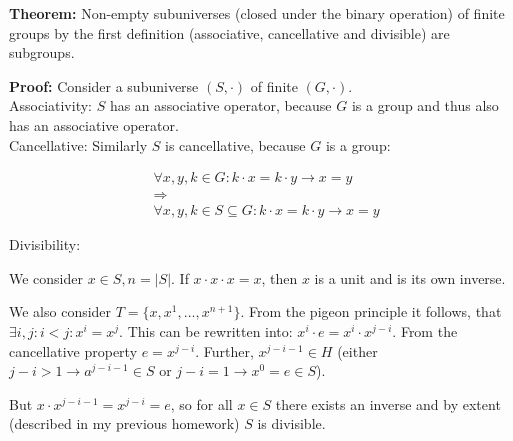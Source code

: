 \documentclass[a4paper]{article}
\begin{document}
\thispagestyle{fancy} %
{}

\textbf{Theorem: } Non-empty subuniverses (closed under the binary operation) of finite groups by the first definition (associative, cancellative and divisible) are subgroups.

\textbf{Proof: }
Consider a subuniverse $(S,\cdot)$ of finite $(G, \cdot)$.\\

Associativity: $S$ has an associative operator, because $G$ is a group and thus also has an associative operator. \\

Cancellative: Similarly $S$ is cancellative, because $G$ is a group:

\begin{align*}
	&\forall x, y, k \in G: k\cdot x = k\cdot y \rightarrow x = y \\
	&\Rightarrow \\
	&\forall x, y, k \in S \subseteq G: k\cdot x = k\cdot y \rightarrow x = y
\end{align*}

Divisibility:

We consider $x \in S, n = |S|$. If $x\cdot x \cdot x = x$, then $x$ is a unit and is its own inverse.

We also consider $T = \{x, x^1, \ldots, x^{n+1}\}$. From the pigeon principle it follows, that $\exists i, j: i < j: x^i = x^j$. This can be rewritten into: $x^i \cdot e = x^i \cdot x^{j-i}$. From the cancellative property $e = x^{j-i}$. Further, $x^{j-i-1} \in H$ (either $j-i>1 \rightarrow a^{j-i-1} \in S$ or $j-i=1 \rightarrow x^0 = e \in S$).

But $x\cdot x^{j-i-1} = x^{j-i} = e$, so for all $x\in S$ there exists an inverse and by extent (described in my previous homework) $S$ is divisible.
\end{document}
